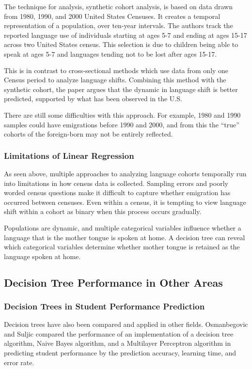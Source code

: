 \documentclass[10pt, conference, compsocconf]{IEEEtran}
\begin{document}
The technique for analysis, synthetic cohort analysis, is based on data drawn from 1980, 1990, and 2000 United States Censuses. It creates a temporal representation of a population, over ten-year intervals. The authors track the reported language use of individuals starting at ages 5-7 and ending at ages 15-17 across two United States census. This selection is due to children being able to speak at ages 5-7 and languages tending not to be lost after ages 15-17. \cite{spanish1}

This is in contrast to cross-sectional methods which use data from only one Census period to analyze language shifts. Combining this method with the synthetic cohort, the paper argues that the dynamic in language shift is better predicted, supported by what has been observed in the U.S. \cite{spanish1}

There are still some difficulties with this approach. For example, 1980 and 1990 samples could have emigrations before 1990 and 2000, and from this the “true” cohorts of the foreign-born may not be entirely reflected. \cite{spanish1}

\subsubsection{Limitations of Linear Regression}
As seen above, multiple approaches to analyzing language cohorts temporally run into limitations in how census data is collected. Sampling errors and poorly worded census questions make it difficult to capture whether emigration has occurred between censuses. Even within a census, it is tempting to view language shift within a cohort as binary when this process occurs gradually.

Populations are dynamic, and multiple categorical variables influence whether a language that is the mother tongue is spoken at home. A decision tree can reveal which categorical variables determine whether mother tongue is retained as the language spoken at home.

\subsection{Decision Tree Performance in Other Areas}
\subsubsection{Decision Trees in Student Performance Prediction}
Decision trees have also been compared and applied in other fields. Osmanbegovic and Suljic compared the performance of an implementation of a decision tree algorithm, Naive Bayes algorithm, and a Multilayer Perceptron algorithm in predicting student performance by the prediction accuracy, learning time, and error rate. \cite{performance1}
\end{document}
